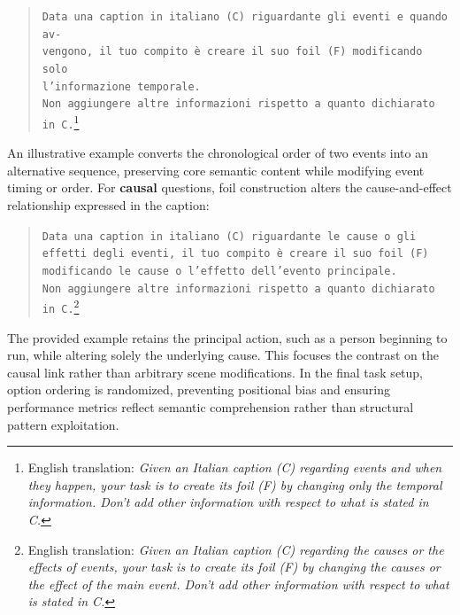 \begin{quote}
\small
\texttt{Data una caption in italiano (C) riguardante gli eventi e quando av-\\vengono, il tuo compito è creare il suo foil (F) modificando solo \\l'informazione temporale.}\\
\texttt{Non aggiungere altre informazioni rispetto a quanto dichiarato in C.}\footnote{English translation: \textit{Given an Italian caption (C) regarding events and when they happen, your task is to create its foil (F) by changing only the temporal information. Don't add other information with respect to what is stated in C.}}
\end{quote}
An illustrative example converts the chronological order of two events into an alternative sequence, preserving core semantic content while modifying event timing or order.
For \textbf{causal} questions, foil construction alters the cause-and-effect relationship expressed in the caption:
\begin{quote}
\small
\texttt{Data una caption in italiano (C) riguardante le cause o gli effetti degli eventi, il tuo compito è creare il suo foil (F) modificando le cause o l'effetto dell'evento principale.}\\
\texttt{Non aggiungere altre informazioni rispetto a quanto dichiarato in C.}\footnote{English translation: \textit{Given an Italian caption (C) regarding the causes or the effects of events, your task is to create its foil (F) by changing the causes or the effect of the main event. Don't add other information with respect to what is stated in C.}}
\end{quote}
The provided example retains the principal action, such as a person beginning to run, while altering solely the underlying cause. This focuses the contrast on the causal link rather than arbitrary scene modifications. In the final task setup, option ordering is randomized, preventing positional bias and ensuring performance metrics reflect semantic comprehension rather than structural pattern exploitation.
